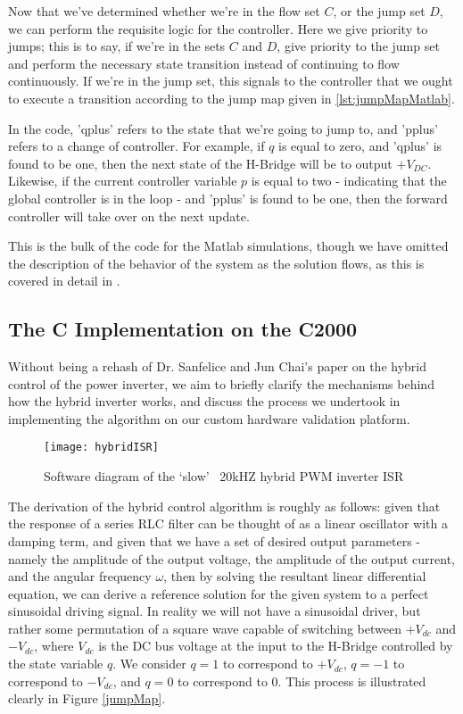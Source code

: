 Now that we've determined whether we're in the flow set $C$, or the jump set $D$, we can perform the requisite logic for the controller. Here we give priority to jumps; this is to say, if we're in the sets $C$ and $D$, give priority to the jump set and perform the necessary state transition instead of continuing to flow continuously. If we're in the jump set, this signals to the controller that we ought to execute a transition according to the jump map given in \ref{lst:jumpMapMatlab}.

In the code, 'qplus' refers to the state that we're going to jump to, and 'pplus' refers to a change of controller. For example, if $q$ is equal to zero, and 'qplus' is found to be one, then the next state of the H-Bridge will be to output $+V_{DC}$. Likewise, if the current controller variable $p$ is equal to two - indicating that the global controller is in the loop - and 'pplus' is found to be one, then the forward controller will take over on the next update. 

This is the bulk of the code for the Matlab simulations, though we have omitted the description of the behavior of the system as the solution flows, as this is covered in detail in \cite{ricardo}.

\subsection{The C Implementation on the C2000}
Without being a rehash of Dr. Sanfelice and Jun Chai's paper on the hybrid control of the power inverter\cite{ricardo}, we aim to briefly clarify the mechanisms behind how the hybrid inverter works, and discuss the process we undertook in implementing the algorithm on our custom hardware validation platform. 

\begin{figure}[h]
\begin{center}
\texttt{[image: hybridISR]}
\caption{Software diagram of the `slow' ~20kHZ hybrid PWM inverter ISR}
\label{fast}
\end{center}
\end{figure}

The derivation of the hybrid control algorithm is roughly as follows: given that the response of a series RLC filter can be thought of as a linear oscillator with a damping term, and given that we have a set of desired output parameters - namely the amplitude of the output voltage, the amplitude of the output current, and the angular frequency $\omega$, then by solving the resultant linear differential equation, we can derive a reference solution for the given system to a perfect sinusoidal driving signal. In reality we will not have a sinusoidal driver, but rather some permutation of a square wave capable of switching between $+V_{dc}$ and $-V_{dc}$, where $V_{dc}$ is the DC bus voltage at the input to the H-Bridge controlled by the state variable $q$. We consider $q=1$ to correspond to $+V_{dc}$, $q=-1$ to correspond to $-V_{dc}$, and $q=0$ to correspond to $0$. This process is illustrated clearly in Figure \ref{jumpMap}.

